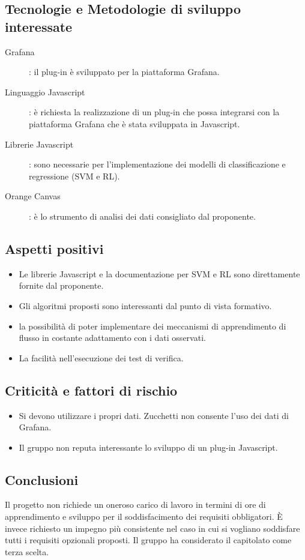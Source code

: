 \documentclass[../studio-di-fattibilita.tex]{subfiles}
\begin{document}
	\subsection{Tecnologie e Metodologie di sviluppo interessate}
	\label{subsec:tecnologie_interessate}
	\begin{description}
		\item [Grafana]: il plug-in è sviluppato per la piattaforma Grafana.
		\item[Linguaggio Javascript]: è richiesta la realizzazione di un plug-in che possa integrarsi con la piattaforma Grafana che è stata sviluppata in Javascript.
		\item[Librerie Javascript]: sono necessarie per l'implementazione dei modelli di classificazione e regressione (SVM e RL).
		\item[Orange Canvas]: è lo strumento di analisi dei dati consigliato dal proponente.
	\end{description}
	\subsection{Aspetti positivi}
	\label{subsec:aspetti_positivi}
	\begin{itemize}
		\item Le librerie Javascript e la documentazione per SVM e RL sono direttamente fornite dal proponente.
		\item Gli algoritmi proposti sono interessanti dal punto di vista formativo.
		\item la possibilità di poter implementare dei meccanismi di apprendimento di flusso in costante adattamento con i dati osservati.
		\item La facilità nell'esecuzione dei test di verifica.
	\end{itemize}
	\subsection{Criticità e fattori di rischio}
	\label{subsec:criticita_e_fattori_di_rischio}
	\begin{itemize}
		\item Si devono utilizzare i propri dati. Zucchetti non consente l'uso dei dati di Grafana.
		\item Il gruppo non reputa interessante lo sviluppo di un plug-in Javascript.
	\end{itemize}
	\subsection{Conclusioni}
	\label{subsec:conclusioni}
	Il progetto non richiede un oneroso carico di lavoro in termini di ore di apprendimento e sviluppo per il soddisfacimento dei requisiti obbligatori. È invece richiesto un impegno più consistente nel caso in cui si vogliano soddisfare tutti i requisiti opzionali proposti. Il gruppo ha considerato il capitolato come terza scelta.
	
\end{document}

